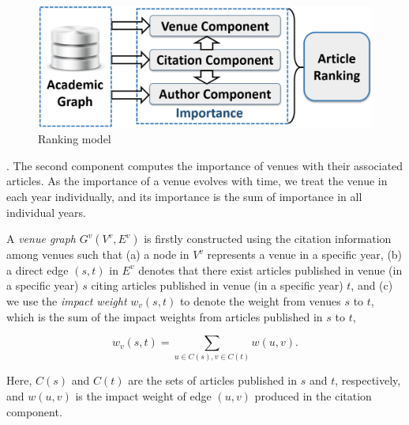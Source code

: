 

\begin{figure}[tb!]
\centering
\includegraphics[scale=0.15]{fig/framework-lite-2.eps}
\vspace{-1ex}
\caption{\small Ranking model \ensemblerank} \label{fig-rankmodel}
\vspace{-3ex}
\end{figure}

.
The second component computes the importance of venues with their associated articles. As the importance of a venue  evolves with time, we treat the venue in each year individually, and its importance is the sum of importance in all individual years.


A {\em venue graph} $G^v(V^v, E^v)$ is firstly constructed using the citation information among venues such that (a) a node in $V^v$ represents a venue in a specific year, (b) a direct edge $(s,t)$ in $E^v$ denotes that there exist articles published in venue (in a specific year) $s$ citing articles published in venue (in a specific year) $t$, and (c) we use the {\em impact weight} $w_v(s,t)$ to denote the weight  from venues $s$ to $t$, which is the sum of the impact weights from articles published in $s$ to $t$, \ie

\vspace{-1ex}
\begin{small}
\begin{equation} \label{eq-infl-weights-v}
w_v(s,t)  = \sum_{u\in C(s), v\in C(t)} w(u,v).
\end{equation}
\end{small}
\noindent
Here, $C(s)$ and $C(t)$ are the sets of articles published in $s$ and $t$, respectively, and $w(u,v)$ is the impact weight of edge $(u, v)$ produced in the citation component.

